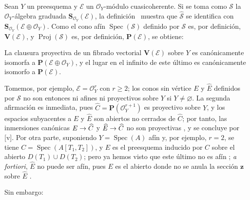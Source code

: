 \documentclass[oneside,10pt]{amsart}
\makeatletter
\renewcommand{\geq}{\geqslant}
\newcommand{\ega@arrow}[2]{\mathchoice{#1}{#2}{#2}{#2}}
\renewcommand{\to}{\ega@arrow{\longrightarrow}{\rightarrow}}
\let\EGAOriginalLabel\label
\renewcommand{\label}[1]{\phantomsection\EGAOriginalLabel{#1}}
\makeatother
\begin{document}
\begin{env}[8.4.1]
\label{II.8.4.1-fr}
Sean $Y$ un preesquema y $\mathcal{E}$ un $\mathcal{O}_Y$-módulo cuasicoherente.
Si se toma como $\mathcal{S}$ la $\mathcal{O}_Y$-álgebra graduada $\mathbf{S}_{\mathcal{O}_Y}(\mathcal{E})$, la definición~ muestra que $\widehat{\mathcal{S}}$ se identifica con $\mathbf{S}_{\mathcal{O}_Y}(\mathcal{E}\oplus\mathcal{O}_Y)$.
Como el cono afín $\operatorname{Spec}(\mathcal{S})$ definido por $\mathcal{S}$ es, por definición, $\mathbf{V}(\mathcal{E})$, y $\operatorname{Proj}(\mathcal{S})$ es, por definición, $\mathbf{P}(\mathcal{E})$, se obtiene:
\end{env}
\begin{proposition}[8.4.2]
\label{II.8.4.2-fr}
La clausura proyectiva de un fibrado vectorial $\mathbf{V}(\mathcal{E})$ sobre $Y$ es canónicamente isomorfa a $\mathbf{P}(\mathcal{E}\oplus\mathcal{O}_Y)$, y el lugar en el infinito de este último es canónicamente isomorfo a $\mathbf{P}(\mathcal{E})$.
\end{proposition}
\begin{remark}[8.4.3]
\label{II.8.4.3-fr}
Tomemos, por ejemplo, $\mathcal{E}=\mathcal{O}_Y^r$ con $r\geq2$;
los conos sin vértice $E$ y $\widehat{E}$ definidos por $\mathcal{S}$ no son entonces ni afines ni proyectivos sobre $Y$ si $Y\neq\varnothing$.
La segunda afirmación es inmediata, pues $\widehat{C}=\mathbf{P}(\mathcal{O}_Y^{r+1})$ es proyectivo sobre $Y$, y los espacios subyacentes a $E$ y $\widehat{E}$ son abiertos no cerrados de $\widehat{C}$; por tanto, las inmersiones canónicas $E\to\widehat{C}$ y $\widehat{E}\to\widehat{C}$ no son proyectivas , y se concluye por [v].
Por otra parte, suponiendo $Y=\operatorname{Spec}(A)$ afín y, por ejemplo, $r=2$, se tiene $C=\operatorname{Spec}(A[T_1,T_2])$, y $E$ es el preesquema inducido por $C$ sobre el abierto $D(T_1)\cup D(T_2)$;
pero ya hemos visto que este último no es afín ;
\emph{a fortiori}, $\widehat{E}$ no puede ser afín, pues $E$ es el abierto donde no se anula la sección $\mathbf{z}$ sobre $\widehat{E}$ .

Sin embargo:
\end{remark}
\end{document}
